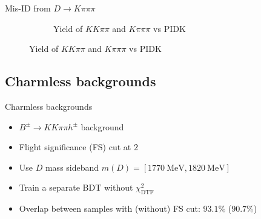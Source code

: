 \documentclass{beamer}
\begin{document}
\begin{frame}{Mis-ID from $D\to K\pi\pi\pi$}
\begin{figure}
\begin{subfigure}{0.5\textwidth}
      \caption{Yield of $KK\pi\pi$ and $K\pi\pi\pi$ vs $\text{PIDK}$}
    \end{subfigure}
  \end{figure}
\end{frame}

\subsection{Charmless backgrounds}
\begin{frame}{Charmless backgrounds}
  \begin{itemize}
    \setlength\itemsep{1.5em}
    \item{$B^\pm\to KK\pi\pi h^\pm$ background}
    \item{Flight significance (FS) cut at $2$}
    \item{Use $D$ mass sideband $m(D) = [\SI{1770}{\mega\eV}, \SI{1820}{\mega\eV}]$}
    \item{Train a separate BDT without $\chi^2_{\text{DTF}}$}
    \item{Overlap between samples with (without) FS cut: $93.1\%$ ($90.7\%$)}
  \end{itemize}
\end{frame}
\end{document}
